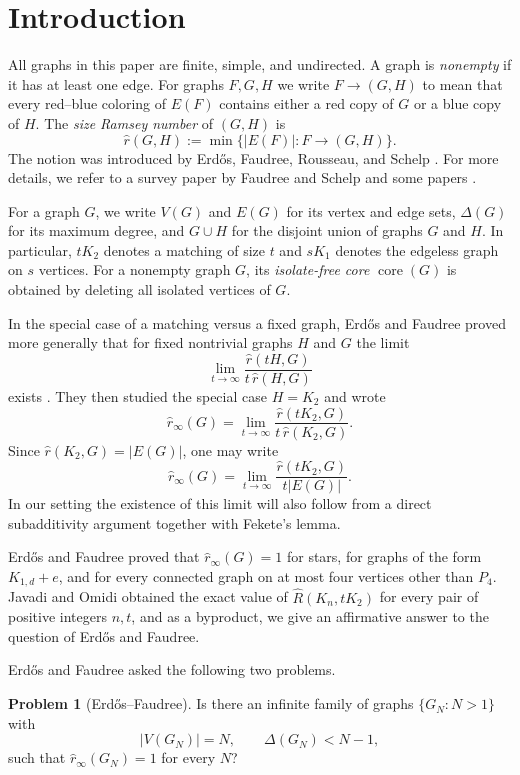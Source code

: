 \documentclass[11pt]{article}
\newcommand{\sr}{\hat r}
\newcommand{\sri}{\hat r_{\infty}}
\newcommand{\core}{\operatorname{core}}
\theoremstyle{definition}
\newtheorem{problem}[theorem]{Problem}
\theoremstyle{remark}
\newcounter{case}
\begin{document}
\section{Introduction}

All graphs in this paper are finite, simple, and undirected. A graph is
\emph{nonempty} if it has at least one edge. For graphs $F,G,H$ we write
$F\to(G,H)$
to mean that every red--blue coloring of $E(F)$ contains either a red copy of $G$
or a blue copy of $H$. The \emph{size Ramsey number} of $(G,H)$ is
\[
\sr(G,H):=\min\{|E(F)|:F\to(G,H)\}.
\]
The notion was introduced by Erd\H{o}s, Faudree, Rousseau, and Schelp
\cite{EFRS78}. For more details, we refer to a survey paper
\cite{FaSh02} by Faudree and Schelp and some papers \cite{Beck83,
Bielak87, CJK18, DJKR21,EFRS78,ErdosFaudree84, FaShe83, FaSh83, KohayakawaRetterRodl, LM98, LuWang}.

For a graph $G$, we write $V(G)$ and $E(G)$ for its vertex and edge sets, $\Delta(G)$
for its maximum degree, and $G\cup H$ for the disjoint union of graphs $G$ and $H$. In
particular, $tK_2$ denotes a matching of size $t$ and $sK_1$ denotes the edgeless graph
on $s$ vertices. For a nonempty graph $G$, its \emph{isolate-free core} $\core(G)$ is
obtained by deleting all isolated vertices of $G$.

In the special case of a matching versus a fixed graph, Erd\H{o}s and Faudree proved
more generally that for fixed nontrivial graphs $H$ and $G$ the limit
\[
\lim_{t\to\infty}\frac{\sr(tH,G)}{t\,\sr(H,G)}
\]
exists \cite{ErdosFaudree84}. They then studied the special case $H=K_2$ and wrote
\[
\sri(G)=\lim_{t\to\infty}\frac{\sr(tK_2,G)}{t\,\sr(K_2,G)}.
\]
Since $\sr(K_2,G)=|E(G)|$, one may write
\[
\sri(G)=\lim_{t\to\infty}\frac{\sr(tK_2,G)}{t|E(G)|}.
\]
In our setting the existence of this limit will also follow from a direct subadditivity
argument together with Fekete's lemma.

Erd\H{o}s and Faudree  \cite{ErdosFaudree84} proved that $\sri(G)=1$ for stars, for graphs of the form
$K_{1,d}+e$, and for every connected graph on at most four vertices other than $P_4$. 
Javadi and Omidi 
\cite{JavadiOmidi2018} obtained the exact value of $\hat{R}(K_n, tK_2)$ for every pair of positive integers $n, t$, and as a byproduct, we give an affirmative answer to the question of Erd\H{o}s and Faudree. 


Erd\H{o}s and Faudree asked the following two problems.
\begin{problem}[Erd\H{o}s--Faudree]\label{prob:EF1}
Is there an infinite family of graphs $\{G_N:N>1\}$ with
\[
|V(G_N)|=N,\qquad \Delta(G_N)<N-1,
\]
such that
$\sri(G_N)=1$
for every $N$?
\end{problem}
\end{document}
